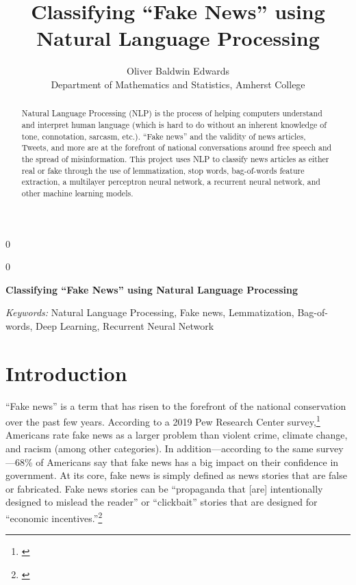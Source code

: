 \documentclass[12pt]{article}
\newcommand{\blind}{0}
\begin{document}
\def\spacingset#1{\renewcommand{\baselinestretch}%
{#1}\small\normalsize} \spacingset{1}



\blind
{
  \title{\bf Classifying ``Fake News'' using Natural Language Processing}

  \author{
        Oliver Baldwin Edwards \\
    Department of Mathematics and Statistics, Amherst College\\
      }
  \maketitle
} \fi

\blind
{
  \bigskip
  \bigskip
  \bigskip
  \begin{center}
    {\LARGE\bf Classifying ``Fake News'' using Natural Language Processing}
  \end{center}
  \medskip
} \fi

\bigskip
\begin{abstract}
Natural Language Processing (NLP) is the process of helping computers
understand and interpret human language (which is hard to do without an
inherent knowledge of tone, connotation, sarcasm, etc.). ``Fake news''
and the validity of news articles, Tweets, and more are at the forefront
of national conversations around free speech and the spread of
misinformation. This project uses NLP to classify news articles as
either real or fake through the use of lemmatization, stop words,
bag-of-words feature extraction, a multilayer perceptron neural network,
a recurrent neural network, and other machine learning models.
\end{abstract}

\noindent%
{\it Keywords:} Natural Language Processing, Fake news, Lemmatization, Bag-of-words, Deep Learning, Recurrent Neural Network
\vfill

\newpage
\spacingset{1.45} %

\hypertarget{introduction}{%
\section{Introduction}\label{introduction}}

``Fake news'' is a term that has risen to the forefront of the national
conservation over the past few years. According to a 2019 Pew Research
Center survey,\footnote{\citet{mitchellManyAmericansSay2019}} Americans
rate fake news as a larger problem than violent crime, climate change,
and racism (among other categories). In addition---according to the same
survey---68\% of Americans say that fake news has a big impact on their
confidence in government. At its core, fake news is simply defined as
news stories that are false or fabricated. Fake news stories can be
``propaganda that {[}are{]} intentionally designed to mislead the
reader'' or ``clickbait'' stories that are designed for ``economic
incentives.''\footnote{\citet{desaiResearchGuidesFake}}
\end{document}
